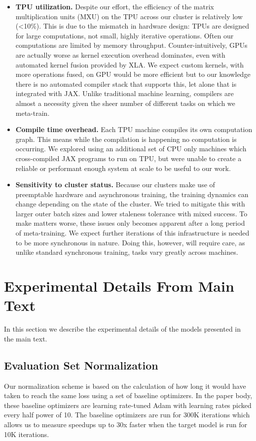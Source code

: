 \documentclass[11pt]{article}
\begin{document}
\begin{itemize}
    \item \textbf{TPU utilization.} Despite our effort, the efficiency of the matrix multiplication units (MXU) on the TPU across our cluster is relatively low (<10\%).
    This is due to the mismatch in hardware design: TPUs are designed for large computations, not small, highly iterative operations. Often our computations are limited by memory throughput.
    Counter-intuitively, GPUs are actually worse as kernel execution overhead dominates, even with automated kernel fusion provided by XLA.
    We expect custom kernels, with more operations fused, on GPU would be more efficient but to our knowledge there is no automated compiler stack that supports this, let alone that is integrated with JAX.
    Unlike traditional machine learning, compilers are almost a necessity given the sheer number of different tasks on which we meta-train.
    \item \textbf{Compile time overhead.} Each TPU machine compiles its own computation graph. This means while the compilation is happening no computation is occurring.
    We explored using an additional set of CPU only machines which cross-compiled JAX programs to run on TPU, but were unable to create a reliable or performant enough system at scale to be useful to our work.
    \item \textbf{Sensitivity to cluster status.} Because our clusters make use of preemptable hardware and asynchronous training, the training dynamics can change depending on the state of the cluster.
    We tried to mitigate this with larger outer batch sizes and lower staleness tolerance with mixed success.
    To make matters worse, these issues only becomes apparent after a long period of meta-training.
    We expect further iterations of this infrastructure is needed to be more synchronous in nature.
    Doing this, however, will require care, as unlike standard synchronous training, tasks vary greatly across machines.
\end{itemize}

\section{Experimental Details From Main Text}
In this section we describe the experimental details of the models presented in the main text.

\subsection{Evaluation Set Normalization} \label{app:fixed_task_normalizer}
Our normalization scheme is based on the calculation of how long it would have taken to reach the same loss using a set of baseline optimizers.
In the paper body, these baseline optimizers are learning rate-tuned Adam with learning rates picked every half power of 10. The baseline optimizers are run for 300K iterations which allows us to measure speedups up to 30x faster when the target model is run for 10K iterations.
\end{document}
